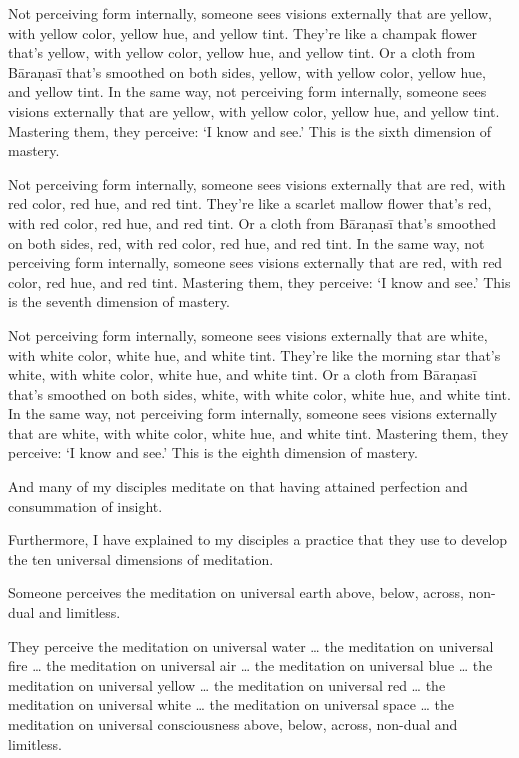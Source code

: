 \documentclass[12pt,openany]{book}%
\begin{document}
Not perceiving form internally, someone sees visions externally that are yellow, with yellow color, yellow hue, and yellow tint. They’re like a champak flower that’s yellow, with yellow color, yellow hue, and yellow tint. Or a cloth from \textsanskrit{Bāraṇasī} that’s smoothed on both sides, yellow, with yellow color, yellow hue, and yellow tint. In the same way, not perceiving form internally, someone sees visions externally that are yellow, with yellow color, yellow hue, and yellow tint. Mastering them, they perceive: ‘I know and see.’ This is the sixth dimension of mastery. 

Not perceiving form internally, someone sees visions externally that are red, with red color, red hue, and red tint. They’re like a scarlet mallow flower that’s red, with red color, red hue, and red tint. Or a cloth from \textsanskrit{Bāraṇasī} that’s smoothed on both sides, red, with red color, red hue, and red tint. In the same way, not perceiving form internally, someone sees visions externally that are red, with red color, red hue, and red tint. Mastering them, they perceive: ‘I know and see.’ This is the seventh dimension of mastery. 

Not perceiving form internally, someone sees visions externally that are white, with white color, white hue, and white tint. They’re like the morning star that’s white, with white color, white hue, and white tint. Or a cloth from \textsanskrit{Bāraṇasī} that’s smoothed on both sides, white, with white color, white hue, and white tint. In the same way, not perceiving form internally, someone sees visions externally that are white, with white color, white hue, and white tint. Mastering them, they perceive: ‘I know and see.’ This is the eighth dimension of mastery. 

And many of my disciples meditate on that having attained perfection and consummation of insight. 

Furthermore, I have explained to my disciples a practice that they use to develop the ten universal dimensions of meditation. 

Someone perceives the meditation on universal earth above, below, across, non-dual and limitless. 

They perceive the meditation on universal water … the meditation on universal fire … the meditation on universal air … the meditation on universal blue … the meditation on universal yellow … the meditation on universal red … the meditation on universal white … the meditation on universal space … the meditation on universal consciousness above, below, across, non-dual and limitless. 
\end{document}
